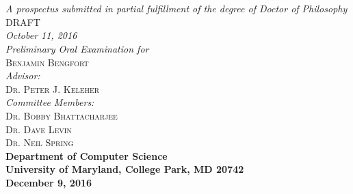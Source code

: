 \documentclass{article}
\begin{document}
\begin{titlepage}
\begin{center}

\textsc{\huge \bfseries {}}\\
\textsc{\huge \bfseries {}}\\[1.0cm]

\emph{A prospectus submitted in partial fulfillment of the degree of Doctor of
Philosophy}\\[5.5cm]

\textsc{\large DRAFT}\\
\emph{October 11, 2016}\\[2.0cm]

\emph{Preliminary Oral Examination for}\\
\textsc{\large Benjamin Bengfort}\\[2.0cm] %
\emph{Advisor:} \\
\textsc{Dr. Peter J. Keleher}\\[.5cm]
\emph{Committee Members:}\\
\textsc{Dr. Bobby Bhattacharjee}\\
\textsc{Dr. Dave Levin}\\
\textsc{Dr. Neil Spring}\\[4.0cm]

{\bfseries Department of Computer Science}\\
{\bfseries University of Maryland, College Park, MD 20742}\\
{\bfseries December 9, 2016}
\vfill

\end{center}
\end{titlepage}

\newpage
\thispagestyle{empty}
\mbox{}
\end{document}
